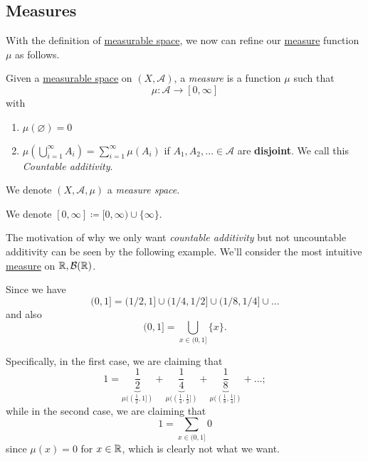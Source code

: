 \subsection{Measures}
With the definition of \hyperref[def:measurable-space]{measurable space}, we now can refine our \hyperref[def:measure]{measure} function \(\mu\) as follows.
\begin{definition}\label{def:measure}
	Given a \hyperref[def:measurable-space]{measurable space} on \((X, \mathcal{A}) \), a \emph{measure} is a function \(\mu\) such that
	\[
		\mu\colon \mathcal{A} \to [0, \infty]
	\]
	with
	\begin{enumerate}
		\item\label{def:measure-empty-measure} \(\mu(\varnothing ) = 0\)
		\item\label{def:measure-countable-additivity} \(\mu\left(\bigcup\limits_{i=1}^{\infty} A_{i}\right) = \sum\limits_{i=1}^{\infty}\mu(A_{i})\) if \(A_1, A_2, \ldots \in \mathcal{A}\)
		are \textbf{disjoint}. We call this \emph{Countable additivity}.
	\end{enumerate}
	We denote \((X, \mathcal{A} , \mu)\) a \emph{measure space}\label{def:measure-space}.
\end{definition}

\begin{notation}
	We denote \([0, \infty] \coloneqq [0, \infty) \cup \{\infty\}\).
\end{notation}

\begin{remark}
	The motivation of why we only want \emph{countable additivity} but not uncountable additivity can be seen by the following example. We'll consider
	the most intuitive \hyperref[def:measure]{measure} on \(\mathbb{\MakeUppercase{R}} , \mathcal{B} (\mathbb{\MakeUppercase{R}})\).

	Since we have
	\[
		(0, 1] = (1 / 2, 1]\cup (1 / 4, 1 / 2]\cup (1 / 8, 1 / 4]\cup \ldots
	\]
	and also
	\[
		(0, 1] = \bigcup\limits_{x\in (0, 1]}\{x\}.
	\]

	Specifically, in the first case, we are claiming that
	\[
		1 = \underbrace{\frac{1}{2}}_{\mu((\frac{1}{2}, 1])} + \underbrace{\frac{1}{4}}_{\mu((\frac{1}{4}, \frac{1}{2}])} + \underbrace{\frac{1}{8}}_{\mu((\frac{1}{8}, \frac{1}{4}])}  + \ldots  ;
	\]
	while in the second case, we are claiming that
	\[
		1 = \sum\limits_{x\in(0, 1]} 0
	\]
	since \(\mu(x) = 0\) for \(x\in \mathbb{\MakeUppercase{R}} \), which is clearly not what we want.
\end{remark}

